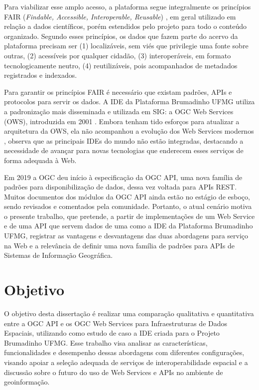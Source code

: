  Para viabilizar esse amplo acesso, a plataforma segue integralmente os princípios FAIR (\textit{Findable, Accessible, Interoperable, Reusable})  \citep{wilkinson2016fair}, em geral utilizado em relação a dados científicos, porém estendidos pelo projeto para todo o conteúdo organizado. Segundo esses princípios, os dados que fazem parte do acervo da plataforma precisam ser (1) localizáveis, sem viés que privilegie uma fonte sobre outras, (2) acessíveis por qualquer cidadão, (3) interoperáveis, em formato tecnologicamente neutro, (4) reutilizáveis, pois acompanhados de metadados registrados e indexados.
 
 Para garantir os princípios FAIR é necessário que existam padrões, APIs e protocolos para servir os dados. A IDE da Plataforma Brumadinho UFMG utiliza a padronização mais disseminada e utilizada em SIG: a OGC Web Services (OWS), introduzida em 2001 \citep{harrison2001introduction}. Embora tenham tido esforços para atualizar a arquitetura da OWS, ela não acompanhou a evolução dos Web Services modernos \citep{tu2006web}, \citep{borba} observa que as principais IDEs do mundo não estão integradas, destacando a necessidade de avançar para novas tecnologias que enderecem esses serviços de forma adequada à Web. 
 
 Em 2019 a OGC deu início à especificação da OGC API, uma nova família de padrões para disponibilização de dados, dessa vez voltada para APIs REST. Muitos documentos dos módulos da OGC API ainda estão no estágio de esboço, sendo revisados e comentados pela comunidade. Portanto, o atual cenário motiva o presente trabalho, que pretende, a partir de implementações de um Web Service e de uma API que servem dados de uma como a IDE da Plataforma Brumadinho UFMG, registrar as vantagens e desvantagens das duas abordagens para serviço na Web e a relevância de definir uma nova família de padrões para APIs de Sistemas de Informação Geográfica.



\section{Objetivo}

O objetivo desta dissertação é realizar uma comparação qualitativa e quantitativa entre a OGC API e os OGC Web Services para Infraestruturas de Dados Espaciais, utilizando como estudo de caso a IDE criada para o Projeto Brumadinho UFMG. Esse trabalho visa analisar as características, funcionalidades e desempenho dessas abordagens com diferentes configurações, visando apoiar a seleção adequada de serviços de interoperabilidade espacial e a discussão sobre o futuro do uso de Web Services e APIs no ambiente de geoinformação.

